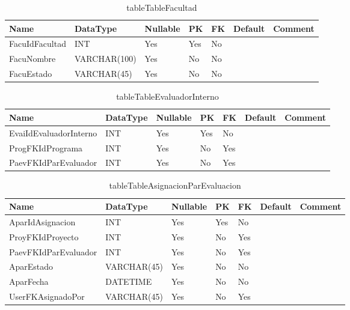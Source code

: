 \begin{table}
	\caption{tableTableFacultad}
	\label{labelTableFacultad}
	\begin{tabular}{ |l|l|l|l|l|l|l| }
		\hline
		Name & DataType & Nullable & PK & FK & Default & Comment \\ \hline
		FacuIdFacultad & INT & Yes & Yes & No &  & \\ \hline 
		FacuNombre & VARCHAR(100) & Yes & No & No &  & \\ \hline 
		FacuEstado & VARCHAR(45) & Yes & No & No &  & \\ \hline 
		
	\end{tabular}
\end{table}


\begin{table}
	\caption{tableTableEvaluadorInterno}
	\label{labelTableEvaluadorInterno}
	\begin{tabular}{ |l|l|l|l|l|l|l| }
		\hline
		Name & DataType & Nullable & PK & FK & Default & Comment \\ \hline
		EvaiIdEvaluadorInterno & INT & Yes & Yes & No &  & \\ \hline 
		ProgFKIdPrograma & INT & Yes & No & Yes &  & \\ \hline 
		PaevFKIdParEvaluador & INT & Yes & No & Yes &  & \\ \hline 
		
	\end{tabular}
\end{table}


\begin{table}
	\caption{tableTableAsignacionParEvaluacion}
	\label{labelTableAsignacionParEvaluacion}
	\begin{tabular}{ |l|l|l|l|l|l|l| }
		\hline
		Name & DataType & Nullable & PK & FK & Default & Comment \\ \hline
		AparIdAsignacion & INT & Yes & Yes & No &  & \\ \hline 
		ProyFKIdProyecto & INT & Yes & No & Yes &  & \\ \hline 
		PaevFKIdParEvaluador & INT & Yes & No & Yes &  & \\ \hline 
		AparEstado & VARCHAR(45) & Yes & No & No &  & \\ \hline 
		AparFecha & DATETIME & Yes & No & No &  & \\ \hline 
		UserFKAsignadoPor & VARCHAR(45) & Yes & No & Yes &  & \\ \hline 
		
	\end{tabular}
\end{table}


